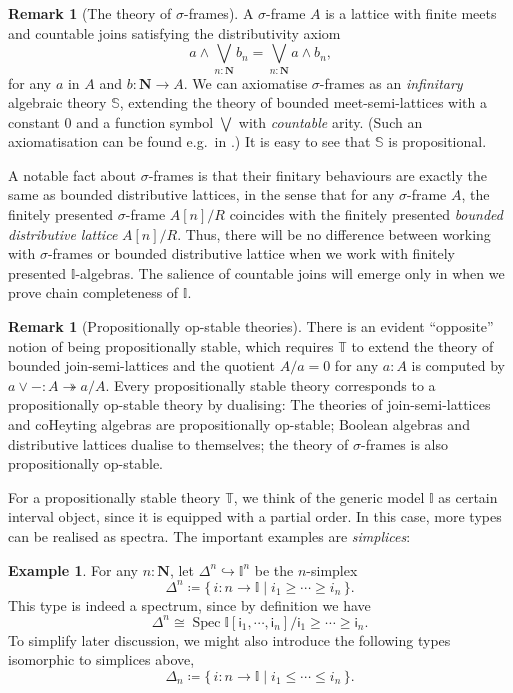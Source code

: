 \documentclass[a4paper,12pt]{amsart}
\theoremstyle{definition}
\newtheorem{example}[theorem]{Example}
\newtheorem{remark}[theorem]{Remark}
\newcommand{\mb}[1]{\mathbf{#1}}
\newcommand{\mbb}[1]{\mathbb{#1}}
\newcommand{\T}{\mbb T}
\newcommand{\I}{\mbb I}
\newcommand{\ms}[1]{\mathsf{#1}}
\newcommand{\scomp}[2]{\{\,#1\mid#2\,\}}
\newcommand{\surj}{\twoheadrightarrow}
\newcommand{\hook}{\hookrightarrow}
\newcommand{\N}{\mb N}
\newcommand{\spec}{\operatorname{Spec}}
\begin{document}
\begin{remark}[The theory of $\sigma$-frames]\label{rem:sigmaframe}
  A $\sigma$-frame $A$ is a lattice with finite meets and countable joins satisfying the distributivity axiom 
  \[ a \wedge \bigvee_{n:\N} b_n = \bigvee_{n:\N} a \wedge b_n\text{,} \]
  for any $a$ in $A$ and $b \colon \N \to A$. We can axiomatise $\sigma$-frames as an \emph{infinitary} algebraic theory $\mbb S$, extending the theory of bounded meet-semi-lattices with a constant $0$ and a function symbol $\bigvee$ with \emph{countable} arity. (Such an axiomatisation can be found e.g.\ in \citet[Exa.~3.26]{adamek1994locally}.) It is easy to see that $\mbb S$ is propositional. 

  A notable fact about $\sigma$-frames is that their finitary behaviours are exactly the same as bounded distributive lattices, in the sense that for any $\sigma$-frame $A$, the finitely presented $\sigma$-frame $A[n]/R$ coincides with the finitely presented \emph{bounded distributive lattice} $A[n]/R$. Thus, there will be no difference between working with $\sigma$-frames or bounded distributive lattice when we work with finitely presented $\I$-algebras. The salience of countable joins will emerge only in  when we prove chain completeness of $\I$.
\end{remark}

\begin{remark}[Propositionally op-stable theories]\label{rem:opprop}
  There is an evident ``opposite'' notion of being propositionally stable, which requires $\T$ to extend the theory of bounded join-semi-lattices and the quotient $A/a = 0$ for any $a:A$ is computed by ${a \vee -} \colon A \surj a/A$. Every propositionally stable theory corresponds to a propositionally op-stable theory by dualising: The theories of join-semi-lattices and coHeyting algebras are propositionally op-stable; Boolean algebras and distributive lattices dualise to themselves; the theory of $\sigma$-frames is also propositionally op-stable.
\end{remark}

For a propositionally stable theory $\T$, we think of the generic model $\I$ as certain interval object, since it is equipped with a partial order. In this case, more types can be realised as spectra. The important examples are \emph{simplices}:

\begin{example}\label{exm:simplicesaffine}
  For any $n : \N$, let $\Delta^n \hook \I^n$ be the $n$-simplex
  \[ \Delta^n \coloneq \scomp{i \colon n \to \I}{i_1 \ge \cdots \ge i_n}\text{.} \]
  This type is indeed a spectrum, since by definition we have
  \[ \Delta^n \cong \spec\I[\ms{i}_1,\cdots,\ms{i}_n]/\ms{i}_1\ge\cdots\ge \ms{i}_n\text{.} \]
  To simplify later discussion, we might also introduce the following types isomorphic to simplices above,
  \[ \Delta_n \coloneq \scomp{i \colon n \to \I}{i_1 \le \cdots \le i_n}\text{.} \]
\end{example}
\end{document}
